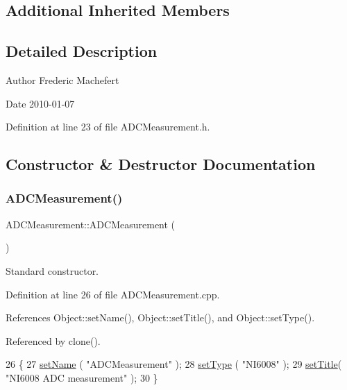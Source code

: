 \subsection*{Additional Inherited Members}


\subsection{Detailed Description}
\begin{DoxyAuthor}{Author}
Frederic Machefert 
\end{DoxyAuthor}
\begin{DoxyDate}{Date}
2010-\/01-\/07 
\end{DoxyDate}


Definition at line 23 of file A\+D\+C\+Measurement.\+h.



\subsection{Constructor \& Destructor Documentation}
\mbox{\label{classADCMeasurement_a93804f658f3aaa78d3ce18199f1bf8e1}} 
\subsubsection{\texorpdfstring{A\+D\+C\+Measurement()}{ADCMeasurement()}}
{\footnotesize\ttfamily A\+D\+C\+Measurement\+::\+A\+D\+C\+Measurement (\begin{DoxyParamCaption}{ }\end{DoxyParamCaption})}



Standard constructor. 



Definition at line 26 of file A\+D\+C\+Measurement.\+cpp.



References Object\+::set\+Name(), Object\+::set\+Title(), and Object\+::set\+Type().



Referenced by clone().


\begin{DoxyCode}
26                                 \{
27   \hyperlink{classObject_ae30fea75683c2d149b6b6d17c09ecd0c}{setName} ( \textcolor{stringliteral}{"ADCMeasurement"} );
28   \hyperlink{classObject_aae534cc9d982bcb9b99fd505f2e103a5}{setType} ( \textcolor{stringliteral}{"NI6008"} );
29   \hyperlink{classObject_a89557dbbad5bcaa02652f5d7fa35d20f}{setTitle}( \textcolor{stringliteral}{"NI6008 ADC measurement"} );  
30 \}
\end{DoxyCode}
\mbox{\label{classADCMeasurement_aa89145ed91025783a1bb277cb480ed1c}} 
